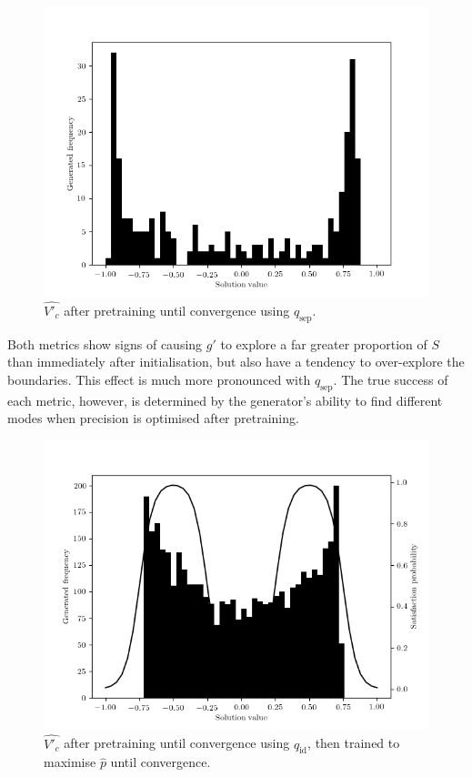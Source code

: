 \documentclass[../../main.tex]{subfiles}
\begin{document}
\begin{figure}[H]
    \begin{center}
    \includegraphics[width=\textwidth]{separationSpread}
    \caption[Generator after $q_\text{sep}$ pretraining]{
        $\hat{V'_c}$ after pretraining until convergence using $q_\text{sep}$.
    }
    \label{fig:separationSpread}
    \end{center}
\end{figure}
Both metrics show signs of causing $g'$ to explore a far greater proportion of $S$ than immediately after initialisation, but also have a tendency to over-explore the boundaries.
This effect is much more pronounced with $q_\text{sep}$.
The true success of each metric, however, is determined by the generator's ability to find different modes when precision is optimised after pretraining.
\begin{figure}[H]
    \begin{center}
    \includegraphics[width=\textwidth]{identityThenPrecision}
    \caption[Generator after $q_\text{id}$ initialised training]{
        $\hat{V'_c}$ after pretraining until convergence using $q_\text{id}$, then trained to maximise $\hat{p}$ until convergence.
    }
    \label{fig:identityThenPrecision}
    \end{center}
\end{figure}
\end{document}
